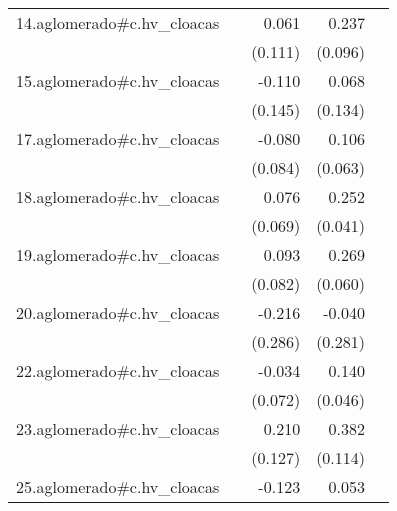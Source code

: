 {\begin{longtable}{l*{4}{D{.}{.}{-1}}}
\addlinespace
14.aglomerado#c.hv\_cloacas&                     &       0.061         &       0.237\sym{*}  &                     \\
            &                     &     (0.111)         &     (0.096)         &                     \\
\addlinespace
15.aglomerado#c.hv\_cloacas&                     &      -0.110         &       0.068         &                     \\
            &                     &     (0.145)         &     (0.134)         &                     \\
\addlinespace
17.aglomerado#c.hv\_cloacas&                     &      -0.080         &       0.106         &                     \\
            &                     &     (0.084)         &     (0.063)         &                     \\
\addlinespace
18.aglomerado#c.hv\_cloacas&                     &       0.076         &       0.252\sym{***}&                     \\
            &                     &     (0.069)         &     (0.041)         &                     \\
\addlinespace
19.aglomerado#c.hv\_cloacas&                     &       0.093         &       0.269\sym{***}&                     \\
            &                     &     (0.082)         &     (0.060)         &                     \\
\addlinespace
20.aglomerado#c.hv\_cloacas&                     &      -0.216         &      -0.040         &                     \\
            &                     &     (0.286)         &     (0.281)         &                     \\
\addlinespace
22.aglomerado#c.hv\_cloacas&                     &      -0.034         &       0.140\sym{**} &                     \\
            &                     &     (0.072)         &     (0.046)         &                     \\
\addlinespace
23.aglomerado#c.hv\_cloacas&                     &       0.210         &       0.382\sym{***}&                     \\
            &                     &     (0.127)         &     (0.114)         &                     \\
\addlinespace
25.aglomerado#c.hv\_cloacas&                     &      -0.123         &       0.053         &                     \\

\end{longtable}}

